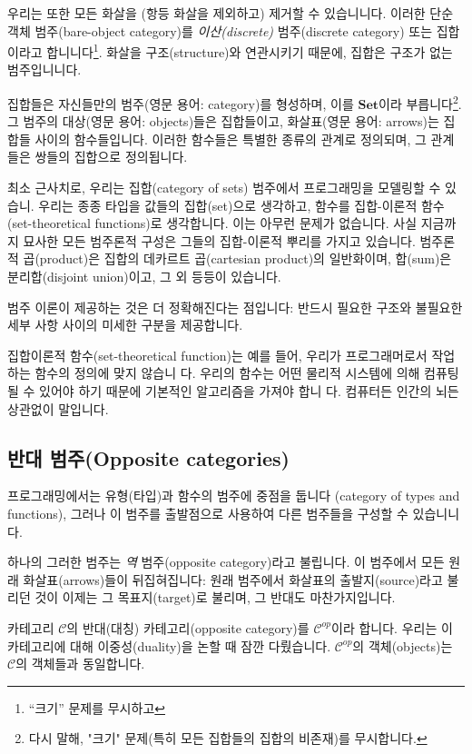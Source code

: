 \documentclass[DaoFP]{subfiles}
\begin{document}
우리는 또한 모든 화살을 (항등 화살을 제외하고) 제거할 수 있습니니다. 이러한 단순 객체 범주(bare-object category)를 \emph{이산(discrete)} 범주(discrete category) 또는 집합이라고 합니니다\footnote{``크기'' 문제를 무시하고}. 화살을 구조(structure)와 연관시키기 때문에, 집합은 구조가 없는 범주입니니다.

집합들은 자신들만의 범주(영문 용어: category)를 형성하며, 이를 $\mathbf{Set}$이라 부릅니다\footnote{다시 말해, "크기" 문제(특히 모든 집합들의 집합의 비존재)를 무시합니다.}. 그 범주의 대상(영문 용어: objects)들은 집합들이고, 화살표(영문 용어: arrows)는 집합들 사이의 함수들입니다. 이러한 함수들은 특별한 종류의 관계로 정의되며, 그 관계들은 쌍들의 집합으로 정의됩니다.

최소 근사치로, 우리는 집합(category of sets) 범주에서 프로그래밍을 모델링할 수 있습니. 우리는 종종 타입을 값들의 집합(set)으로 생각하고, 함수를 집합-이론적 함수(set-theoretical functions)로 생각합니다. 이는 아무런 문제가 없습니다. 사실 지금까지 묘사한 모든 범주론적 구성은 그들의 집합-이론적 뿌리를 가지고 있습니다. 범주론적 곱(product)은 집합의 데카르트 곱(cartesian product)의 일반화이며, 합(sum)은 분리합(disjoint union)이고, 그 외 등등이 있습니다.

범주 이론이 제공하는 것은 더 정확해진다는 점입니다: 반드시 필요한 구조와 불필요한 세부 사항 사이의 미세한 구분을 제공합니다.

집합이론적 함수(set-theoretical function)는 예를 들어, 우리가 프로그래머로서 작업하는 함수의 정의에 맞지 않습니 다. 우리의 함수는 어떤 물리적 시스템에 의해 컴퓨팅될 수 있어야 하기 때문에 기본적인 알고리즘을 가져야 합니 다. 컴퓨터든 인간의 뇌든 상관없이 말입니다.

\subsection{반대 범주(Opposite categories)}
프로그래밍에서는 유형(타입)과 함수의 범주에 중점을 둡니다 (category of types and functions), 그러나 이 범주를 출발점으로 사용하여 다른 범주들을 구성할 수 있습니니다.
 
하나의 그러한 범주는 \emph{역} 범주(opposite category)라고 불립니다. 이 범주에서 모든 원래 화살표(arrows)들이 뒤집혀집니다: 원래 범주에서 화살표의 출발지(source)라고 불리던 것이 이제는 그 목표지(target)로 불리며, 그 반대도 마찬가지입니다.

카테고리 $\mathcal{C}$의 반대(대칭) 카테고리(opposite category)를 $\mathcal{C}^{op}$이라 합니다. 우리는 이 카테고리에 대해 이중성(duality)을 논할 때 잠깐 다뤘습니다. $\mathcal{C}^{op}$의 객체(objects)는 $\mathcal{C}$의 객체들과 동일합니다.
\end{document}
